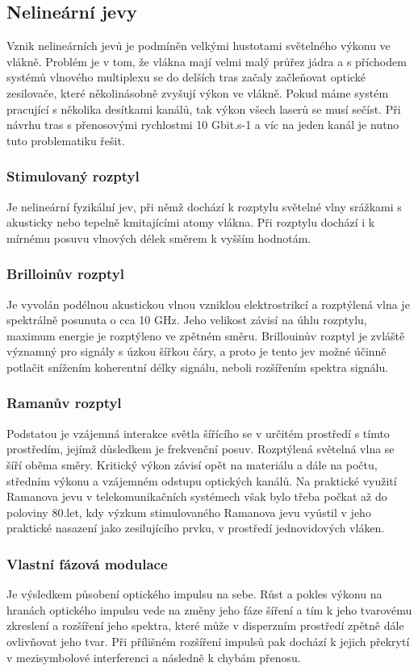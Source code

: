 \subsection{Nelineární jevy}
Vznik nelineárních jevů je podmíněn velkými hustotami světelného výkonu ve vlákně. Problém je v tom, že vlákna mají velmi malý průřez jádra a s příchodem systémů vlnového multiplexu se do delších tras začaly začleňovat optické zesilovače, které několinásobně zvyšují výkon ve vlákně. Pokud máme systém pracující s několika desítkami kanálů, tak výkon všech laserů se musí sečíst. Při návrhu tras s přenosovými rychlostmi 10 Gbit.s-1 a víc na jeden kanál je nutno tuto problematiku řešit.

\subsubsection{Stimulovaný rozptyl}
Je nelineární fyzikální jev, při němž dochází k rozptylu světelné vlny srážkami s akusticky nebo tepelně kmitajícími atomy vlákna. Při rozptylu dochází i k mírnému posuvu vlnových délek směrem k vyšším hodnotám. 

\subsubsection{Brilloinův rozptyl}
Je vyvolán podélnou akustickou vlnou vzniklou elektrostrikcí a rozptýlená vlna je spektrálně posunuta o cca 10 GHz. Jeho velikost závisí na úhlu rozptylu, maximum energie je rozptýleno ve zpětném směru. Brillouinův rozptyl je zvláště významný pro signály s úzkou šířkou čáry, a proto je tento jev možné účinně potlačit snížením koherentní délky signálu, neboli rozšířením spektra signálu.

\subsubsection{Ramanův rozptyl}
 Podstatou je vzájemná interakce světla šířícího se v určitém prostředí s tímto prostředím, jejímž důsledkem je frekvenční posuv. Rozptýlená světelná vlna se šíří oběma směry. Kritický výkon závisí opět na materiálu a dále na počtu, středním výkonu a vzájemném odstupu optických kanálů. Na praktické využití Ramanova jevu v telekomunikačních systémech však bylo třeba počkat až do poloviny 80.let, kdy výzkum stimulovaného Ramanova jevu vyústil v jeho praktické nasazení jako zesilujícího prvku, v prostředí jednovidových vláken. 

\subsubsection{Vlastní fázová modulace}
Je výsledkem působení optického impulsu na sebe. Růst a pokles výkonu na hranách optického impulsu vede na změny jeho fáze šíření a tím k jeho tvarovému zkreslení a rozšíření jeho spektra, které může v disperzním prostředí zpětně dále ovlivňovat jeho tvar. Při přílišném rozšíření impulsů pak dochází k jejich překrytí v mezisymbolové interferenci a následně k chybám přenosu.

